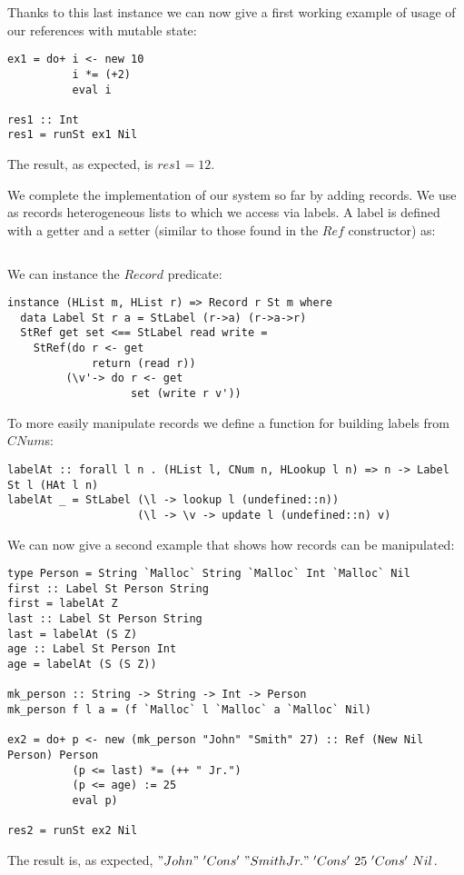 Thanks to this last instance we can now give a first working example of usage of our references with mutable state:
\begin{lstlisting}
ex1 = do+ i <- new 10
          i *= (+2)
          eval i

res1 :: Int
res1 = runSt ex1 Nil
\end{lstlisting}

The result, as expected, is $res1=12$.

We complete the implementation of our system so far by adding records. We use as records heterogeneous lists to which we access via labels. A label is defined with a getter and a setter (similar to those found in the $Ref$ constructor) as:
\begin{lstlisting}
\end{lstlisting}

We can instance the $Record$ predicate:
\begin{lstlisting}
instance (HList m, HList r) => Record r St m where
  data Label St r a = StLabel (r->a) (r->a->r)
  StRef get set <== StLabel read write =
    StRef(do r <- get
             return (read r))
         (\v'-> do r <- get
                   set (write r v'))
\end{lstlisting}

To more easily manipulate records we define a function for building labels from $CNum$s:
\begin{lstlisting}
labelAt :: forall l n . (HList l, CNum n, HLookup l n) => n -> Label St l (HAt l n)
labelAt _ = StLabel (\l -> lookup l (undefined::n)) 
                    (\l -> \v -> update l (undefined::n) v)
\end{lstlisting}

We can now give a second example that shows how records can be manipulated:
\begin{lstlisting}
type Person = String `Malloc` String `Malloc` Int `Malloc` Nil
first :: Label St Person String
first = labelAt Z
last :: Label St Person String
last = labelAt (S Z)
age :: Label St Person Int
age = labelAt (S (S Z))

mk_person :: String -> String -> Int -> Person
mk_person f l a = (f `Malloc` l `Malloc` a `Malloc` Nil)

ex2 = do+ p <- new (mk_person "John" "Smith" 27) :: Ref (New Nil Person) Person
          (p <= last) *= (++ " Jr.")
          (p <= age) := 25
          eval p)

res2 = runSt ex2 Nil
\end{lstlisting}
The result is, as expected, $"John"\ 'Cons'\ "Smith Jr."\ 'Cons'\ 25\ 'Cons'\ Nil$.

